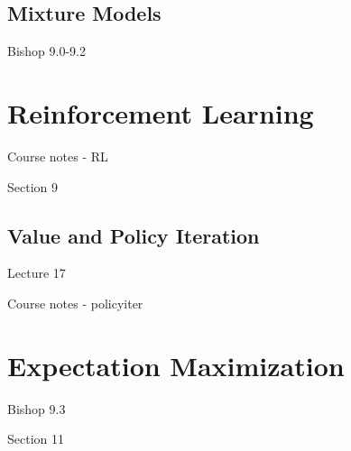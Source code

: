 \documentclass[11pt, oneside]{article}   	%
\begin{document}
\subsection{Mixture Models}
Bishop 9.0-9.2

\section{Reinforcement Learning}
Course notes - RL

Section 9

\subsection{Value and Policy Iteration}
Lecture 17

Course notes - policyiter

\section{Expectation Maximization}

Bishop 9.3

Section 11
\end{document}

